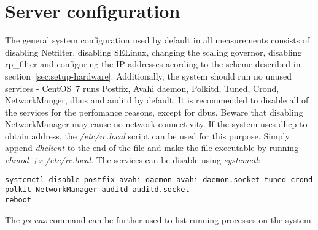 
\section{Server configuration}\label{sec:setup-server}
The general system configuration used by default in all measurements
consists of disabling Netfilter, disabling SELinux, changing the scaling governor, disabling rp\_filter and
configuring the IP addresses acording to the scheme described in section~\ref{sec:setup-hardware}.
Additionally, the system should run no unused services - CentOS~7 runs Postfix, Avahi daemon, Polkitd, Tuned, Crond,
NetworkManger, dbus and auditd by default.
It is recommended to disable all of the services for the perfomance reasons, except for dbus.
Beware that disabling NetworkManager may cause no network connectivity.
If the system uses dhcp to obtain address, the {\it{/etc/rc.local}} script can be used for this purpose.
Simply append {\it{dhclient}} to the end of the file and make the file executable by running {\it{chmod +x /etc/rc.local}}.
The services can be disable using {\it{systemctl}}:
\begin{lstlisting}
systemctl disable postfix avahi-daemon avahi-daemon.socket tuned crond polkit NetworkManager auditd auditd.socket
reboot
\end{lstlisting}
The {\it{ps uax}} command can be further used to list running processes on the system.
\\

